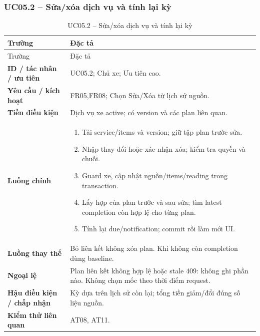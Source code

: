 \subsubsection{UC05.2 -- Sửa/xóa dịch vụ và tính lại kỳ}\label{uc:UC05.2}
\begin{smalltable}\begin{longtable}{L{3.2cm}L{11.8cm}}
\caption{UC05.2 -- Sửa/xóa dịch vụ và tính lại kỳ}\label{tab:UC05.2}\\
\toprule Trường & Đặc tả\\\midrule\endfirsthead
\toprule Trường & Đặc tả\\\midrule\endhead
\textbf{ID / tác nhân / ưu tiên} & UC05.2; Chủ xe; Ưu tiên cao.\\
\textbf{Yêu cầu / kích hoạt} & FR05,FR08; Chọn Sửa/Xóa từ lịch sử nguồn.\\
\textbf{Tiền điều kiện} & Dịch vụ xe active; có version và các plan liên quan.\\
\textbf{Luồng chính} & \begin{enumerate}[leftmargin=*,nosep]
\item Tải service/items và version; giữ tập plan trước sửa.
\item Nhập thay đổi hoặc xác nhận xóa; kiểm tra quyền và chuỗi.
\item Guard xe, cập nhật nguồn/items/reading trong transaction.
\item Lấy hợp của plan trước và sau sửa; tìm latest completion còn hợp lệ cho từng plan.
\item Tính lại due/notification; commit rồi làm mới UI.
\end{enumerate}\\
\textbf{Luồng thay thế} & Bỏ liên kết không xóa plan. Khi không còn completion dùng baseline.\\
\textbf{Ngoại lệ} & Plan liên kết không hợp lệ hoặc stale 409: không ghi phần nào. Không chọn mốc theo thời điểm request.\\
\textbf{Hậu điều kiện / chấp nhận} & Kỳ dựa trên lịch sử còn lại; tổng tiền giảm/đổi đúng số liệu nguồn.\\
\textbf{Kiểm thử liên quan} & AT08, AT11.\\
\bottomrule\end{longtable}\end{smalltable}
